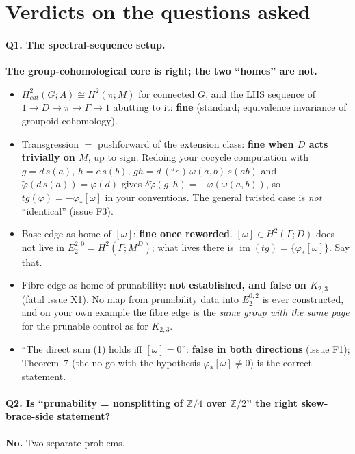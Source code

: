 \documentclass[11pt]{article}
\newcommand{\Z}{\mathbb{Z}}
\begin{document}
\section*{Verdicts on the questions asked}

\paragraph{Q1. The spectral-sequence setup.} \textbf{The group-cohomological core is
right; the two ``homes'' are not.}
\begin{itemize}[leftmargin=*]
\item $H^2_{cat}(G;A)\cong H^2(\pi;M)$ for connected $G$, and the LHS sequence of
  $1\to D\to\pi\to\Gamma\to1$ abutting to it: \textbf{fine} (standard; equivalence
  invariance of groupoid cohomology).
\item Transgression $=$ pushforward of the extension class: \textbf{fine when $D$ acts
  trivially on $M$}, up to sign. Redoing your cocycle computation with
  $g=d\,s(a)$, $h=e\,s(b)$, $gh=d\,({}^a e)\,\omega(a,b)\,s(ab)$ and
  $\tilde\varphi(d\,s(a))=\varphi(d)$ gives
  $\delta\tilde\varphi(g,h)=-\varphi(\omega(a,b))$, so $tg(\varphi)=-\varphi_*[\omega]$ in
  your conventions. The general twisted case is \emph{not} ``identical'' (issue F3).
\item Base edge as home of $[\omega]$: \textbf{fine once reworded}. $[\omega]\in
  H^2(\Gamma;D)$ does not live in $E_2^{2,0}=H^2(\Gamma;M^D)$; what lives there is
  $\operatorname{im}(tg)=\{\varphi_*[\omega]\}$. Say that.
\item Fibre edge as home of prunability: \textbf{not established, and false on
  $K_{2,3}$} (fatal issue X1). No map from prunability data into $E_2^{0,2}$ is
  ever constructed, and on your own example the fibre edge is the \emph{same group
  with the same page} for the prunable control as for $K_{2,3}$.
\item ``The direct sum (1) holds iff $[\omega]=0$'': \textbf{false in both directions}
  (issue F1); Theorem~7 (the no-go with the hypothesis $\varphi_*[\omega]\neq0$) is the
  correct statement.
\end{itemize}

\paragraph{Q2. Is ``prunability = nonsplitting of $\Z/4$ over $\Z/2$'' the right
skew-brace-side statement?} \textbf{No.} Two separate problems.
\end{document}
